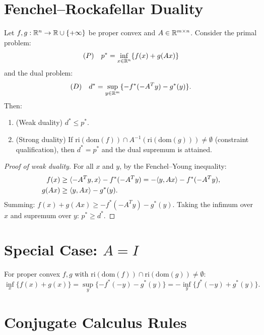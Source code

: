 \section{Fenchel--Rockafellar Duality}

\begin{theorem}
\label{thm:fenchel_rockafellar}
Let $f, g : \mathbb{R}^n \to \mathbb{R} \cup \{+\infty\}$ be proper convex and $A \in \mathbb{R}^{m \times n}$.
Consider the primal problem:
\[
    (P) \quad p^* = \inf_{x \in \mathbb{R}^n} \{f(x) + g(Ax)\}
\]
and the dual problem:
\[
    (D) \quad d^* = \sup_{y \in \mathbb{R}^m} \{-f^*(-A^Ty) - g^*(y)\}.
\]
Then:
\begin{enumerate}
    \item (Weak duality) $d^* \leq p^*$.
    \item (Strong duality) If $\mathrm{ri}(\mathrm{dom}(f)) \cap
          A^{-1}(\mathrm{ri}(\mathrm{dom}(g))) \neq \emptyset$ (constraint
          qualification), then $d^* = p^*$ and the dual supremum is attained.
\end{enumerate}
\end{theorem}

\begin{proof}[Proof of weak duality]
For all $x$ and $y$, by the Fenchel--Young inequality:
\begin{align*}
    f(x) &\geq \langle -A^Ty, x \rangle - f^*(-A^Ty) = -\langle y, Ax \rangle - f^*(-A^Ty), \\
    g(Ax) &\geq \langle y, Ax \rangle - g^*(y).
\end{align*}
Summing: $f(x) + g(Ax) \geq -f^*(-A^Ty) - g^*(y)$.
Taking the infimum over $x$ and supremum over $y$: $p^* \geq d^*$.
\end{proof}

\section{Special Case: $A = I$}

\begin{corollary}
For proper convex $f, g$ with $\mathrm{ri}(\mathrm{dom}(f)) \cap
\mathrm{ri}(\mathrm{dom}(g)) \neq \emptyset$:
\[
    \inf_x \{f(x) + g(x)\} = \sup_y \{-f^*(-y) - g^*(y)\}
    = -\inf_y \{f^*(-y) + g^*(y)\}.
\]
\end{corollary}

\section{Conjugate Calculus Rules}

